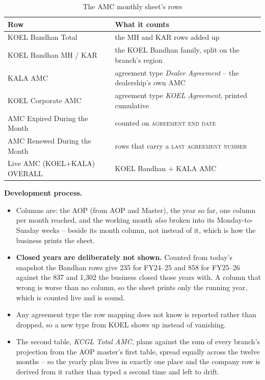 \documentclass[11pt,a4paper]{article}
\newcommand{\devproc}{\textbf{Development process.}\par}
\newcommand{\col}[1]{\textsc{\small #1}}
\begin{document}
\begin{table}[H]\centering\small
\begin{tabularx}{\linewidth}{@{}p{5.4cm}X@{}}
\toprule
\textbf{Row} & \textbf{What it counts} \\
\midrule
KOEL Bandhan Total & the MH and KAR rows added up \\
KOEL Bandhan MH / KAR & the KOEL Bandhan family, split on the branch's region \\
KALA AMC & agreement type \emph{Dealer Agreement} -- the dealership's own AMC \\
KOEL Corporate AMC & agreement type \emph{KOEL Agreement}, printed cumulative \\
AMC Expired During the Month & counted on \col{agreement end date} \\
AMC Renewed During the Month & rows that carry a \col{last agreement number} \\
Live AMC (KOEL+KALA) OVERALL & KOEL Bandhan + KALA AMC \\
\bottomrule
\end{tabularx}
\caption{The AMC monthly sheet's rows}
\end{table}

\devproc
\begin{itemize}
  \item Columns are: the AOP (from AOP and Master), the year so far, one column per month
  reached, and the working month \emph{also} broken into its Monday-to-Sunday weeks --
  beside its month column, not instead of it, which is how the business prints the sheet.
  \item \textbf{Closed years are deliberately not shown.} Counted from today's snapshot
  the Bandhan rows give 235 for FY24--25 and 858 for FY25--26 against the 837 and 1,302
  the business closed those years with. A column that wrong is worse than no column, so
  the sheet prints only the running year, which is counted live and is sound.
  \item Any agreement type the row mapping does not know is reported rather than dropped,
  so a new type from KOEL shows up instead of vanishing.
  \item The second table, \emph{KCGL Total AMC}, plans against the sum of every branch's
  projection from the AOP master's first table, spread equally across the twelve months --
  so the yearly plan lives in exactly one place and the company row is derived from it
  rather than typed a second time and left to drift.
\end{itemize}
\end{document}
